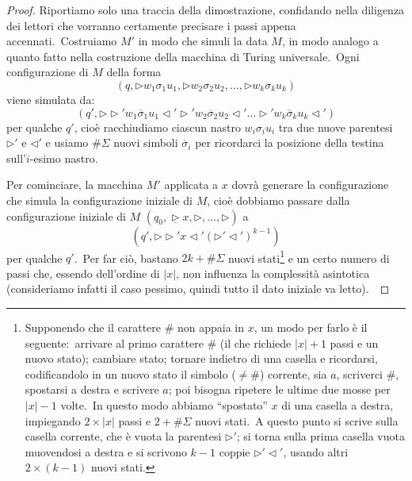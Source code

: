 \begin{proof}
    Riportiamo solo una traccia della dimostrazione, confidando nella diligenza dei lettori che vorranno certamente precisare i passi appena accennati.\
    Costruiamo $M'$ in modo che simuli la data $M$, in modo analogo a quanto fatto nella costruzione della macchina di Turing universale.\
    Ogni configurazione di $M$ della forma
    \[(q, \triangleright w_1 \sigma_1 u_1, \triangleright w_2 \sigma_2 u_2, \dots, \triangleright w_k \sigma_k u_k)\]
    viene simulata da:
    \[(q', \triangleright \triangleright' w_1 \overline{\sigma}_1 u_1 \triangleleft' \triangleright' w_2 \overline{\sigma}_2 u_2 \triangleleft' \dots  \triangleright' w_k \overline{\sigma}_k u_k \triangleleft')\]
    per qualche $q'$, cioè racchiudiamo ciascun nastro $w_i \sigma_i u_i$ tra due nuove parentesi $\triangleright'$ e $\triangleleft'$ e usiamo $\#\Sigma$ nuovi simboli $\overline{\sigma}_i$ per ricordarci la posizione della testina sull'$i$-esimo nastro.\

    Per cominciare, la macchina $M'$ applicata a $x$ dovrà generare la configurazione che simula la configurazione iniziale di $M$, cioè dobbiamo passare dalla configurazione iniziale di $M$ $(q_0, \underline{\triangleright} x, \triangleright, \dots, \triangleright)$ a
    \[(q', \triangleright \triangleright' x \triangleleft' (\triangleright' \triangleleft')^{k-1})\]
    per qualche $q'$.\
    Per far ciò, bastano $2k + \#\Sigma$ nuovi stati\footnote{Supponendo che il carattere \# non appaia in $x$, un modo per farlo è il seguente:\
        arrivare al primo carattere \# (il che richiede $|x| + 1$ passi e un nuovo stato); cambiare
        stato; tornare indietro di una casella e ricordarsi, codificandolo in un nuovo stato il simbolo ($\neq \#$) corrente, sia $a$, scriverci \#, spostarsi a destra e scrivere $a$; poi bisogna ripetere le ultime due mosse per $|x| - 1$ volte.\ In questo modo abbiamo ``spostato'' $x$ di una casella a destra, impiegando $2 \times |x|$ passi e $2 + \#\Sigma$ nuovi stati.\ A questo punto si scrive sulla casella corrente, che è vuota la parentesi $\triangleright'$; si torna sulla prima casella vuota muovendosi a destra e si scrivono $k - 1$ coppie $\triangleright' \triangleleft'$, usando altri $2 \times (k - 1)$ nuovi stati.} e un certo numero di passi che, essendo dell'ordine di $|x|$, non influenza la complessità asintotica (consideriamo infatti il caso pessimo, quindi tutto il dato iniziale va letto).\


\end{proof}
